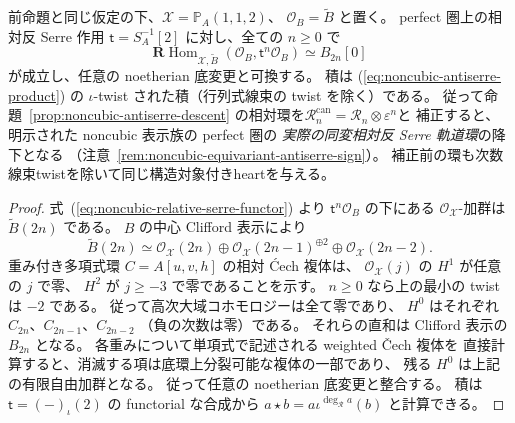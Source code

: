 \begin{corollary}
\label{cor:noncubic-relative-orbit-hom}
前命題と同じ仮定の下、$\mathcal X=\mathbb P_A(1,1,2)$、
$\mathcal O_B=\widetilde B$ と置く。
perfect 圏上の相対反 Serre 作用
$\mathsf t=S_A^{-1}[2]$ に対し、全ての $n\ge0$ で
\[
 \mathbf R\operatorname{Hom}_{\mathcal X,\widetilde B}
    (\mathcal O_B,\mathsf t^n\mathcal O_B)
       \simeq B_{2n}[0]
 \tag{NC-orbit}\label{eq:noncubic-relative-orbit-hom}
\]
が成立し、任意の noetherian 底変更と可換する。
積は (\ref{eq:noncubic-antiserre-product}) の
$\iota$-twist された積（行列式線束の twist を除く）である。
従って命題~\ref{prop:noncubic-antiserre-descent}
の相対環を$\mathcal R_n^{\mathrm{can}}=\mathcal R_n\otimes\varepsilon^n$と
補正すると、明示された noncubic 表示族の perfect 圏の
\emph{実際の同変相対反 Serre 軌道環}の降下となる
（注意~\ref{rem:noncubic-equivariant-antiserre-sign}）。
補正前の環も次数線束twistを除いて同じ構造対象付きheartを与える。
\end{corollary}
\begin{proof}
式~(\ref{eq:noncubic-relative-serre-functor}) より
$\mathsf t^n\mathcal O_B$ の下にある
$\mathcal O_{\mathcal X}$-加群は
$\widetilde B(2n)$ である。
$B$ の中心 Clifford 表示により
\[
 \widetilde B(2n)\simeq
 \mathcal O_{\mathcal X}(2n)
 \oplus\mathcal O_{\mathcal X}(2n-1)^{\oplus2}
 \oplus\mathcal O_{\mathcal X}(2n-2).
\]
重み付き多項式環 $C=A[u,v,h]$ の相対 \'Cech 複体は、
$\mathcal O_{\mathcal X}(j)$ の $H^1$ が任意の $j$ で零、
$H^2$ が $j\ge-3$ で零であることを示す。
$n\ge0$ なら上の最小の twist は $-2$ である。
従って高次大域コホモロジーは全て零であり、
$H^0$ はそれぞれ $C_{2n}$、$C_{2n-1}$、$C_{2n-2}$
（負の次数は零）である。
それらの直和は Clifford 表示の $B_{2n}$ となる。
各重みについて単項式で記述される weighted \v{C}ech 複体を
直接計算すると、消滅する項は底環上分裂可能な複体の一部であり、
残る $H^0$ は上記の有限自由加群となる。
従って任意の noetherian 底変更と整合する。
積は $\mathsf t=(-)_\iota(2)$ の functorial な合成から
$a\star b=a\iota^{\deg_{\mathcal R}a}(b)$ と計算できる。
\end{proof}

